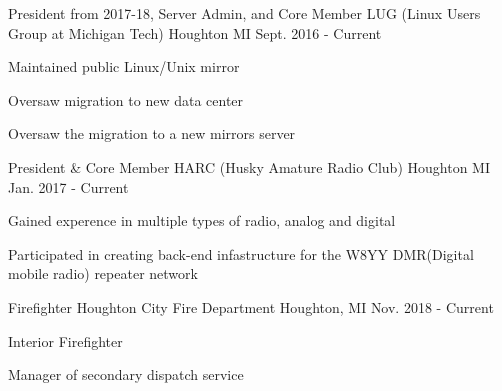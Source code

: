 

\begin{cventries}

  \cventry
    {President from 2017-18, Server Admin, and Core Member} %
    {LUG (Linux Users Group at Michigan Tech)} %
    {Houghton MI} %
    {Sept. 2016 - Current} %
    {
      \begin{cvitems} %
        \item {Maintained public Linux/Unix mirror}
        \item {Oversaw migration to new data center}
        \item {Oversaw the migration to a new mirrors server}
      \end{cvitems}
    }

  \cventry
    {President \& Core Member} %
    {HARC (Husky Amature Radio Club)} %
    {Houghton MI} %
    {Jan. 2017 - Current} %
    {
      \begin{cvitems} %
        \item {Gained experence in multiple types of radio, analog and digital}
        \item {Participated in creating back-end infastructure for the W8YY DMR(Digital mobile radio) repeater network}
      \end{cvitems}
    }


  \cventry
    {Firefighter} %
    {Houghton City Fire Department} %
    {Houghton, MI} %
    {Nov. 2018 - Current} %
    {
      \begin{cvitems} %
        \item {Interior Firefighter}
        \item {Manager of secondary dispatch service}
      \end{cvitems}
    }



\end{cventries}
